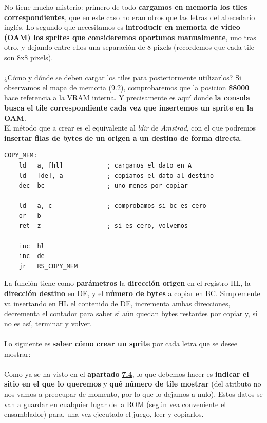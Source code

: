 No tiene mucho misterio: primero de todo \textbf{cargamos en memoria los tiles correspondientes}, que en este caso no eran otros que las letras del abecedario inglés. Lo segundo que necesitamos es \textbf{introducir en memoria de vídeo (OAM) los sprites que consideremos oportunos manualmente}, uno tras otro, y dejando entre ellos una separación de 8 pixels (recordemos que cada tile son 8x8 pixels).
\\ \\
¿Cómo y dónde se deben cargar los tiles para posteriormente utilizarlos? Si observamos el mapa de memoria (\hyperref[memory_map]{9.2}), comprobaremos que la posicion \textbf{\$8000} hace referencia a la VRAM interna. Y precisamente es aquí donde \textbf{la consola busca el tile correspondiente cada vez que insertemos un sprite en la OAM}.
\\
El método que a crear es el equivalente al \textit{ldir} de \textit{Amstrad}, con el que podremos \textbf{insertar filas de bytes de un origen a un destino de forma directa}.

\begin{lstlisting}[caption={Copia de Memoria}, label={code:copy_mem}]
COPY_MEM:
	ld 	 a, [hl]			; cargamos el dato en A
	ld	 [de], a			; copiamos el dato al destino
	dec	 bc					; uno menos por copiar
							
	ld	 a, c				; comprobamos si bc es cero
	or	 b
	ret	 z					; si es cero, volvemos
	
	inc	 hl
	inc	 de
	jr	 RS_COPY_MEM

\end{lstlisting}

La función tiene como \textbf{parámetros} la \textbf{dirección origen} en el registro HL, la \textbf{dirección destino} en DE, y el \textbf{número de bytes} a copiar en BC. Simplemente va insertando en HL el contenido de DE, incrementa ambas direcciones, decrementa el contador para saber si aún quedan bytes restantes por copiar y, si no es así, terminar y volver.
\\ \\
Lo siguiente es \textbf{saber cómo crear un sprite} por cada letra que se desee mostrar:
\\ \\
Como ya se ha visto en el \textbf{apartado} \hyperref[manual_sprites]{\textbf{7.4}}, lo que debemos hacer es \textbf{indicar el sitio en el que lo queremos} y \textbf{qué número de tile mostrar} (del atributo no nos vamos a preocupar de momento, por lo que lo dejamos a nulo). Estos datos se van a guardar en cualquier lugar de la ROM (según vea conveniente el ensamblador) para, una vez ejecutado el juego, leer y copiarlos.

